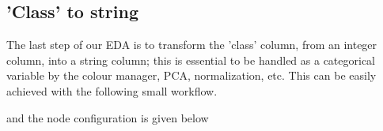 \documentclass[11pt]{article}
\begin{document}
		\subsection*{'Class' to  string}
			The last step of our EDA is to transform the 'class' column, from an integer column, into a string column; this is essential to be handled as a categorical variable by the colour manager, PCA, normalization, etc. This can be easily achieved with the following small workflow.

			and the node configuration is given below

\end{document}
